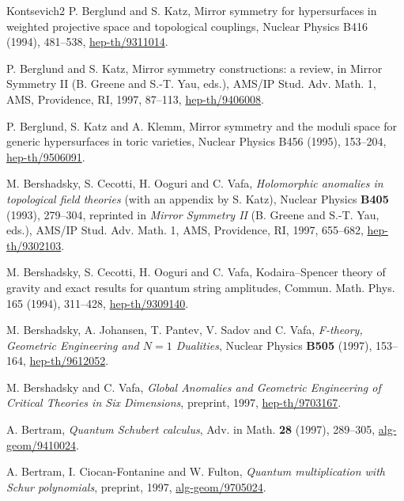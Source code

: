 \begin{thebibliography}{Kontsevich2}
\hypertarget{bib:BK1}{}
P. Berglund and S. Katz,
Mirror symmetry for hypersurfaces in weighted projective space
and topological couplings,
Nuclear Physics B416 (1994), 481--538, \href{https://arxiv.org/abs/hep-th/9311014}{hep-th/9311014}.

\hypertarget{bib:BK2}{}
P. Berglund and S. Katz, Mirror symmetry constructions: a review, in Mirror Symmetry II
(B. Greene and S.-T. Yau, eds.), AMS/IP Stud. Adv. Math. 1, AMS,
Providence, RI, 1997, 87--113, \href{https://arxiv.org/abs/hep-th/9406008}{hep-th/9406008}.

\hypertarget{bib:BKK}{}
P. Berglund, S. Katz and A. Klemm,
Mirror symmetry and the moduli space for generic hypersurfaces in toric varieties,
Nuclear Physics B456 (1995), 153--204, \href{https://arxiv.org/abs/hep-th/9506091}{hep-th/9506091}.

\hypertarget{bib:BCOV1}{} M. Bershadsky, S. Cecotti, H. Ooguri and C. Vafa, \emph{Holomorphic anomalies in topological field theories} (with an appendix by S. Katz), Nuclear Physics \textbf{B405} (1993), 279--304, reprinted in \emph{Mirror Symmetry II} (B. Greene and S.-T. Yau, eds.), AMS/IP Stud. Adv. Math. 1, AMS, Providence, RI, 1997, 655--682, \href{https://arxiv.org/abs/hep-th/9302103}{hep-th/9302103}.

\hypertarget{bib:BCOV2}{}
M. Bershadsky, S. Cecotti, H. Ooguri and C. Vafa,
Kodaira--Spencer theory of gravity and exact results for quantum string amplitudes,
Commun. Math. Phys. 165 (1994), 311--428, \href{https://arxiv.org/abs/hep-th/9309140}{hep-th/9309140}.

\hypertarget{bib:BJPSV}{} M. Bershadsky, A. Johansen, T. Pantev, V. Sadov and C. Vafa, \emph{F-theory, Geometric Engineering and $N=1$ Dualities}, Nuclear Physics \textbf{B505} (1997), 153--164, \href{https://arxiv.org/abs/hep-th/9612052}{hep-th/9612052}.

\hypertarget{bib:BV}{} M. Bershadsky and C. Vafa, \emph{Global Anomalies and Geometric Engineering of Critical Theories in Six Dimensions}, preprint, 1997, \href{https://arxiv.org/abs/hep-th/9703167}{hep-th/9703167}.

\hypertarget{bib:Bertram}{} A. Bertram, \emph{Quantum Schubert calculus}, Adv. in Math. \textbf{28} (1997), 289--305, \href{https://arxiv.org/abs/alg-geom/9410024}{alg-geom/9410024}.

\hypertarget{bib:BCF}{} A. Bertram, I. Ciocan-Fontanine and W. Fulton, \emph{Quantum multiplication with Schur polynomials}, preprint, 1997, \href{https://arxiv.org/abs/alg-geom/9705024}{alg-geom/9705024}.


\end{thebibliography}
